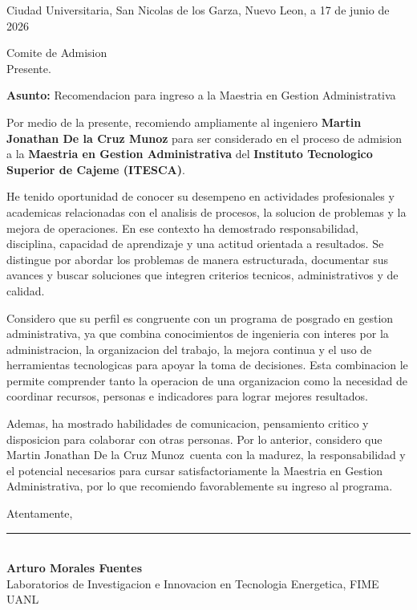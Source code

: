 \documentclass[11pt,letterpaper]{article}
\newcommand{\citydate}{Ciudad Universitaria, San Nicolas de los Garza, Nuevo Leon, a 17 de junio de 2026}
\newcommand{\recipient}{Comite de Admision}
\newcommand{\programname}{Maestria en Gestion Administrativa}
\newcommand{\institutionname}{Instituto Tecnologico Superior de Cajeme (ITESCA)}
\newcommand{\subjectline}{Recomendacion para ingreso a la Maestria en Gestion Administrativa}
\newcommand{\applicantname}{Martin Jonathan De la Cruz Munoz}
\newcommand{\recommendername}{Arturo Morales Fuentes}
\newcommand{\recommenderposition}{Laboratorios de Investigacion e Innovacion en Tecnologia Energetica, FIME UANL}
\begin{document}
\begin{flushright}
\citydate
\end{flushright}

\recipient\\
Presente.

\vspace{0.8em}
\textbf{Asunto:} \subjectline

\vspace{0.8em}
\justifying
Por medio de la presente, recomiendo ampliamente al ingeniero \textbf{\applicantname} para ser considerado en el proceso de admision a la \textbf{\programname} del \textbf{\institutionname}.

He tenido oportunidad de conocer su desempeno en actividades profesionales y academicas relacionadas con el analisis de procesos, la solucion de problemas y la mejora de operaciones. En ese contexto ha demostrado responsabilidad, disciplina, capacidad de aprendizaje y una actitud orientada a resultados. Se distingue por abordar los problemas de manera estructurada, documentar sus avances y buscar soluciones que integren criterios tecnicos, administrativos y de calidad.

Considero que su perfil es congruente con un programa de posgrado en gestion administrativa, ya que combina conocimientos de ingenieria con interes por la administracion, la organizacion del trabajo, la mejora continua y el uso de herramientas tecnologicas para apoyar la toma de decisiones. Esta combinacion le permite comprender tanto la operacion de una organizacion como la necesidad de coordinar recursos, personas e indicadores para lograr mejores resultados.

Ademas, ha mostrado habilidades de comunicacion, pensamiento critico y disposicion para colaborar con otras personas. Por lo anterior, considero que \applicantname\ cuenta con la madurez, la responsabilidad y el potencial necesarios para cursar satisfactoriamente la \programname, por lo que recomiendo favorablemente su ingreso al programa.

\vspace{1.8em}
Atentamente,

\vspace{3.0em}
\rule{0.58\textwidth}{0.4pt}\\[-0.2em]
\textbf{\recommendername}\\
\recommenderposition
\end{document}

